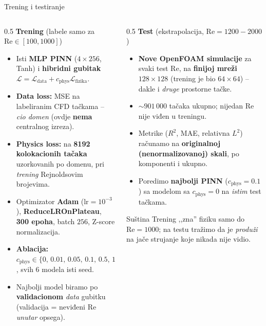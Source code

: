 \documentclass[10pt,aspectratio=169]{beamer}
\begin{document}
\begin{frame}{Trening i testiranje}
  \scriptsize
  \begin{columns}[T]
    \begin{column}{0.5\textwidth}
      \textbf{Trening} \; (labele samo za $\mathrm{Re}\in[100,1000]$)
      \begin{itemize}
        \item Isti \textbf{MLP PINN} ($4\times256$, Tanh) i \textbf{hibridni gubitak}
              $\mathcal{L}=\mathcal{L}_{\text{data}}+c_{\text{phys}}\mathcal{L}_{\text{fizika}}$.
        \item \textbf{Data loss:} MSE na labeliranim CFD tačkama -- \emph{cio domen}
              (ovdje \textbf{nema} centralnog izreza).
        \item \textbf{Physics loss:} na \textbf{8192 kolokacionih tačaka}
              uzorkovanih po domenu, pri \emph{trening} Rejnoldsovim brojevima.
        \item Optimizator \textbf{Adam} ($\text{lr}=10^{-3}$), \textbf{ReduceLROnPlateau},
              \textbf{300 epoha}, batch $256$, Z-score normalizacija.
        \item \textbf{Ablacija:} $c_{\text{phys}}\in\{0,\,0.01,\,0.05,\,0.1,\,0.5,\,1\}$,
              svih 6 modela isti seed.
        \item Najbolji model biramo po \textbf{validacionom} \emph{data} gubitku
              (validacija = neviđeni $\mathrm{Re}$ \emph{unutar} opsega).
      \end{itemize}
    \end{column}
    \begin{column}{0.5\textwidth}
      \textbf{Test} \; (ekstrapolacija, $\mathrm{Re}=1200\!-\!2000$)
      \begin{itemize}
        \item \textbf{Nove OpenFOAM simulacije} za svaki test $\mathrm{Re}$, na
              \textbf{finijoj mreži $128\times128$} (trening je bio $64\times64$)
              -- dakle i \emph{druge} prostorne tačke.
        \item $\sim\!901\,000$ tačaka ukupno; nijedan $\mathrm{Re}$ nije viđen u treningu.
        \item Metrike ($R^2$, MAE, relativna $L^2$) računamo na
              \textbf{originalnoj (nenormalizovanoj) skali}, po komponenti i ukupno.
        \item Poredimo \textbf{najbolji PINN} ($c_{\text{phys}}{=}0.1$) sa
              modelom sa $c_{\text{phys}}{=}0$ na \emph{istim} test tačkama.
      \end{itemize}
      \vfill
      \begin{block}{Suština}
        Trening ,,zna'' fiziku samo do $\mathrm{Re}=1000$; na testu tražimo da je
        \emph{produži} na jače strujanje koje nikada nije vidio.
      \end{block}
    \end{column}
  \end{columns}
\end{frame}
\end{document}
